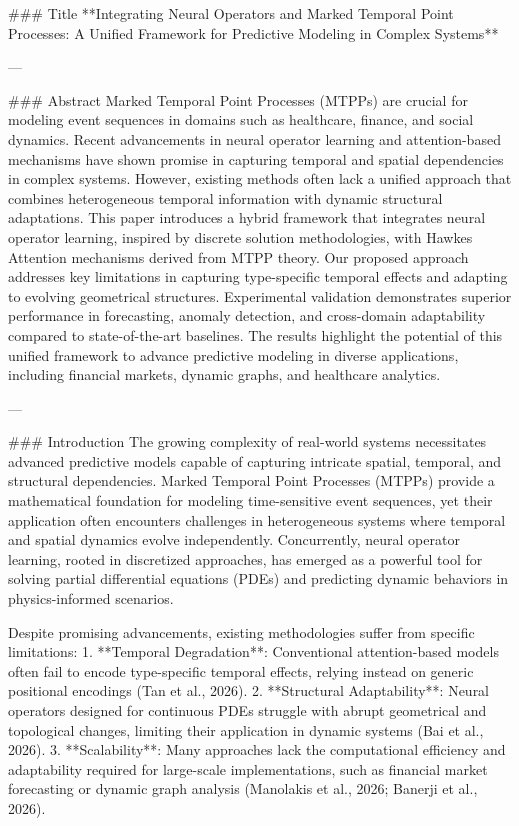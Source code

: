 ### Title
**Integrating Neural Operators and Marked Temporal Point Processes: A Unified Framework for Predictive Modeling in Complex Systems**

---

### Abstract
Marked Temporal Point Processes (MTPPs) are crucial for modeling event sequences in domains such as healthcare, finance, and social dynamics. Recent advancements in neural operator learning and attention-based mechanisms have shown promise in capturing temporal and spatial dependencies in complex systems. However, existing methods often lack a unified approach that combines heterogeneous temporal information with dynamic structural adaptations. This paper introduces a hybrid framework that integrates neural operator learning, inspired by discrete solution methodologies, with Hawkes Attention mechanisms derived from MTPP theory. Our proposed approach addresses key limitations in capturing type-specific temporal effects and adapting to evolving geometrical structures. Experimental validation demonstrates superior performance in forecasting, anomaly detection, and cross-domain adaptability compared to state-of-the-art baselines. The results highlight the potential of this unified framework to advance predictive modeling in diverse applications, including financial markets, dynamic graphs, and healthcare analytics.

---

### Introduction
The growing complexity of real-world systems necessitates advanced predictive models capable of capturing intricate spatial, temporal, and structural dependencies. Marked Temporal Point Processes (MTPPs) provide a mathematical foundation for modeling time-sensitive event sequences, yet their application often encounters challenges in heterogeneous systems where temporal and spatial dynamics evolve independently. Concurrently, neural operator learning, rooted in discretized approaches, has emerged as a powerful tool for solving partial differential equations (PDEs) and predicting dynamic behaviors in physics-informed scenarios.

Despite promising advancements, existing methodologies suffer from specific limitations:
1. **Temporal Degradation**: Conventional attention-based models often fail to encode type-specific temporal effects, relying instead on generic positional encodings (Tan et al., 2026).
2. **Structural Adaptability**: Neural operators designed for continuous PDEs struggle with abrupt geometrical and topological changes, limiting their application in dynamic systems (Bai et al., 2026).
3. **Scalability**: Many approaches lack the computational efficiency and adaptability required for large-scale implementations, such as financial market forecasting or dynamic graph analysis (Manolakis et al., 2026; Banerji et al., 2026).

